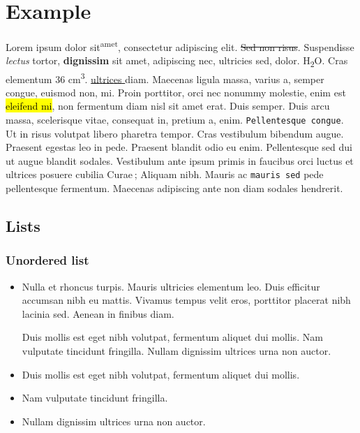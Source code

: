 \documentclass[a4paper]{article}
\begin{document}
\lipsum[2]


\section{Example}
Lorem ipsum dolor sit\textsuperscript{amet}, consectetur adipiscing elit. \sout{Sed non risus}. Suspendisse
  \emph{lectus} tortor, \textbf{dignissim} sit amet, adipiscing nec, ultricies sed, dolor. H\textsubscript{2}O.
  Cras elementum 36 cm\textsuperscript{3}. \uline{ ultrices } diam. Maecenas ligula massa, varius a, semper
  congue, euismod non, mi. Proin porttitor, orci nec nonummy molestie, enim est \hl{eleifend mi},
  non fermentum diam nisl sit amet erat. Duis semper. Duis arcu massa, scelerisque vitae, consequat in, pretium a, enim.
  \texttt{Pellentesque congue}. Ut in risus volutpat libero pharetra tempor. Cras vestibulum bibendum augue.
  Praesent egestas leo in pede. Praesent blandit odio eu enim. Pellentesque sed dui ut augue blandit sodales. Vestibulum
  ante ipsum primis in faucibus orci luctus et ultrices posuere cubilia Curae ; Aliquam nibh. Mauris ac \lstinline[language=c]{mauris sed}
  pede pellentesque fermentum. Maecenas adipiscing ante non diam sodales hendrerit.


\subsection{Lists}
\subsubsection{Unordered list}
\begin{itemize}
\item
Nulla et rhoncus turpis. Mauris ultricies elementum leo. Duis efficitur
      accumsan nibh eu mattis. Vivamus tempus velit eros, porttitor placerat nibh
      lacinia sed. Aenean in finibus diam.


Duis mollis est eget nibh volutpat, fermentum aliquet dui mollis.
Nam vulputate tincidunt fringilla.
Nullam dignissim ultrices urna non auctor.


\item Duis mollis est eget nibh volutpat, fermentum aliquet dui mollis.
\item Nam vulputate tincidunt fringilla.
\item Nullam dignissim ultrices urna non auctor.
\end{itemize}
\end{document}
